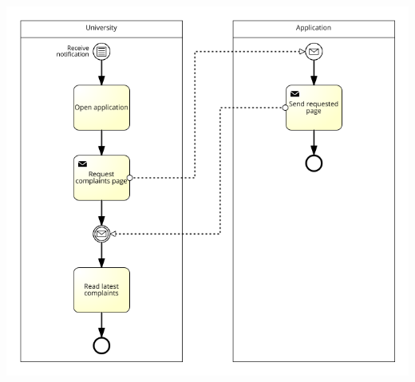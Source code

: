 \documentclass[11pt,twoside]{article}
\begin{document}
\begin{center}
\includegraphics[width=\textwidth]{Images/UC12}
\end{center}

\newpage
\end{document}

